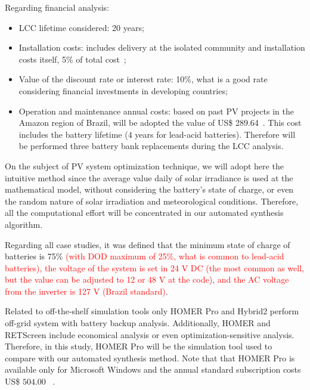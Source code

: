 \documentclass[review]{elsarticle}
\begin{document}
Regarding financial analysis:
\begin{itemize}
	\item LCC lifetime considered: 20 years;
	\item Installation costs: includes delivery at the isolated community and installation costs itself, 5\% of total cost~\cite{Agrener2013};
	\item Value of the discount rate or interest rate: 10\%, what is a good rate considering financial investments in developing countries;
	\item Operation and maintenance annual costs: based on past PV projects in the Amazon region of Brazil, will be adopted the value of US\$ 289.64~\citep{Agrener2013}. This cost includes the battery lifetime (4 years for lead-acid batteries). Therefore will be performed three battery bank replacements during the LCC analysis.
\end{itemize}

On the subject of PV system optimization technique, we will adopt here the intuitive method since the average value daily of solar irradiance is used at the mathematical model, without considering the battery's state of charge, or even the random nature of solar irradiation and meteorological conditions. Therefore, all the computational effort will be concentrated in our automated synthesis algorithm.

Regarding all case studies, it was defined that the minimum state of charge of batteries is 75\% \textcolor{red}{(with DOD maximum of 25\%, what is common to lead-acid batteries), the voltage of the system is set in 24 V DC (the most common as well, but the value can be adjusted to 12 or 48 V at the code), and the AC voltage from the inverter is 127 V (Brazil standard)}.

Related to off-the-shelf simulation tools only HOMER Pro and Hybrid2 perform off-grid system with battery backup analysis. %
Additionally, HOMER and RETScreen include economical analysis or even optimization-sensitive analysis. Therefore, in this study, HOMER Pro will be the simulation tool used to compare with our automated synthesis method. Note that that HOMER Pro is available only for Microsoft Windows and the annual standard subscription costs US\$ $504.00$ \textcolor{red}{~\cite{HOMER}}.
\end{document}
